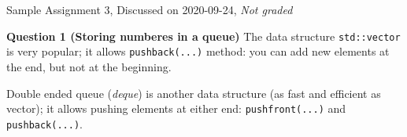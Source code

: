 \documentclass[11pt]{article}
\begin{document}
\thispagestyle{empty}



\begin{center}
{\Large Sample Assignment 3, Discussed on 2020-09-24},
{\em Not graded}
\end{center}

\vspace{10pt}
{\bf Question 1 (Storing numberes in a queue)} The data structure {\tt std::vector} 
is very popular; it allows {\tt push\textunderscore{}back(...)} method:
you can add new elements at the end, but not at the beginning. 

Double ended queue ({\em deque}) is another data structure (as fast and efficient as vector); 
it allows pushing elements at either end: 
{\tt push\textunderscore{}front(...)} and {\tt push\textunderscore{}back(...)}.
\end{document}
